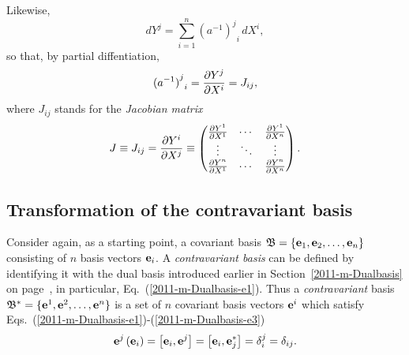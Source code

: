Likewise,
\begin{equation}
d{ Y }^j   =
\sum_{i=1}^n {{({a^{-1}})}^j}_i\, d{X}^i,
\end{equation}
so that, by partial diffentiation,
\begin{equation}
{{(a^{-1})}^j}_i =
{\partial { Y }^j \over \partial X^i}   =J_{ij},
\label{2001-mu-tensor-tl2nl}
\end{equation}
where $J_{ij}$ stands for
the {\em Jacobian matrix}
\begin{equation}
J\equiv
J_{ij}={\partial { Y }^i\over \partial {X}^j }
\equiv
\begin{pmatrix}
{\partial { Y }^1\over \partial {X}^1}&\cdots&{\partial { Y }^1\over \partial {X}^n}\\
\vdots&\ddots &\vdots\\
{\partial { Y }^n\over \partial {X}^1}&\cdots&{\partial { Y }^n\over \partial {X}^n}
\end{pmatrix} .
\label{2013-m-t-jm}
\end{equation}


\subsection{Transformation of the contravariant basis}

Consider again, as a starting point, a covariant basis
${\mathfrak B}=\{{\bf e}_1,{\bf e}_2,\ldots ,{\bf e}_n\}$ consisting of
$n$ basis vectors ${\bf e}_i$.
A {\em contravariant basis} can be defined by identifying it with the dual basis
introduced earlier in Section~\ref{2011-m-Dualbasis} on page~\pageref{2011-m-Dualbasis},
in particular, Eq.~(\ref{2011-m-Dualbasis-e1}).
Thus a {\em contravariant} basis
${\mathfrak B^\ast}=\{{\bf e}^1,{\bf e}^2,\ldots ,{\bf e}^n\}$ is a set of $n$ covariant
basis vectors ${\bf e}^i$
which satisfy Eqs.~(\ref{2011-m-Dualbasis-e1})-(\ref{2011-m-Dualbasis-e3})
\begin{equation}
{\bf e}^j \left( {\bf e}_i \right) = \left[{\bf e}_i,{\bf e}^j \right] =  \left[{\bf e}_i,  {\bf e}_j^\ast \right] = \delta^j_i = \delta_{ij}
.
\label{2001-mu-tensors0}
\end{equation}

